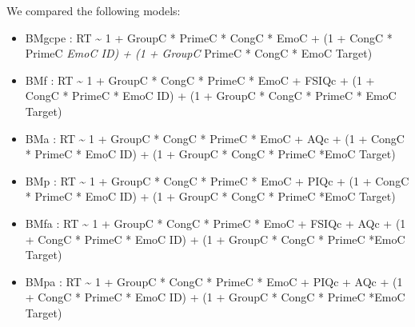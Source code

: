 \documentclass[
  11pt,
  english,
  ,doc,floatsintext]{apa6}
\begin{document}
We compared the following models:

\begin{itemize}
\item
  BMgcpe : RT \textasciitilde{} 1 + GroupC * PrimeC * CongC * EmoC + (1 + CongC * PrimeC \emph{
  EmoC \textbar\textbar{} ID) + (1 + GroupC } PrimeC * CongC * EmoC \textbar\textbar{} Target)
\item
  BMf : RT \textasciitilde{} 1 + GroupC * CongC * PrimeC * EmoC + FSIQc + (1 + CongC * PrimeC * EmoC \textbar\textbar{} ID) + (1 + GroupC * CongC * PrimeC * EmoC \textbar\textbar{} Target)
\item
  BMa : RT \textasciitilde{} 1 + GroupC * CongC * PrimeC * EmoC + AQc + (1 + CongC * PrimeC * EmoC \textbar\textbar{} ID) + (1 + GroupC * CongC * PrimeC *EmoC \textbar\textbar{} Target)
\item
  BMp : RT \textasciitilde{} 1 + GroupC * CongC * PrimeC * EmoC + PIQc + (1 + CongC * PrimeC * EmoC \textbar\textbar{} ID) + (1 + GroupC * CongC * PrimeC *EmoC \textbar\textbar{} Target)
\item
  BMfa : RT \textasciitilde{} 1 + GroupC * CongC * PrimeC * EmoC + FSIQc + AQc + (1 + CongC * PrimeC * EmoC \textbar\textbar{} ID) + (1 + GroupC * CongC * PrimeC *EmoC \textbar\textbar{} Target)
\item
  BMpa : RT \textasciitilde{} 1 + GroupC * CongC * PrimeC * EmoC + PIQc + AQc + (1 + CongC * PrimeC * EmoC \textbar\textbar{} ID) + (1 + GroupC * CongC * PrimeC *EmoC \textbar\textbar{} Target)
\end{itemize}
\end{document}
